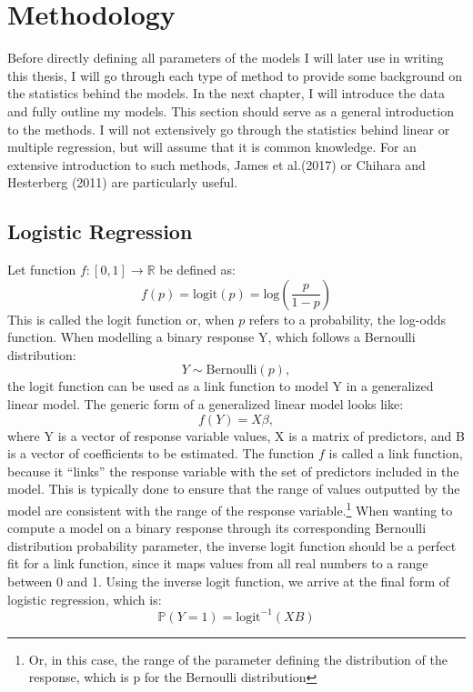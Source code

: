\documentclass[12pt,twoside]{reedthesis}
\begin{document}
  \section{Methodology}\label{methodology}
  
  Before directly defining all parameters of the models I will later use
  in writing this thesis, I will go through each type of method to provide
  some background on the statistics behind the models. In the next
  chapter, I will introduce the data and fully outline my models. This
  section should serve as a general introduction to the methods. I will
  not extensively go through the statistics behind linear or multiple
  regression, but will assume that it is common knowledge. For an
  extensive introduction to such methods, James et al.(2017) or Chihara
  and Hesterberg (2011) are particularly useful.
  
  \subsection{Logistic Regression}\label{logistic-regression}
  
  Let function \(f : [0, 1] \to \mathbb{R}\) be defined as:
  \[f(p) = \text{logit}(p) = \text{log}\left( \frac{p}{1-p} \right)\] This
  is called the logit function or, when \(p\) refers to a probability, the
  log-odds function. When modelling a binary response Y, which follows a
  Bernoulli distribution: \[Y \sim \text{Bernoulli}(p),\] the logit
  function can be used as a link function to model Y in a generalized
  linear model. The generic form of a generalized linear model looks
  like:\\
  \[f(Y) = X\beta ,\] where Y is a vector of response variable values, X
  is a matrix of predictors, and B is a vector of coefficients to be
  estimated. The function \(f\) is called a link function, because it
  ``links'' the response variable with the set of predictors included in
  the model. This is typically done to ensure that the range of values
  outputted by the model are consistent with the range of the response
  variable.\footnote{Or, in this case, the range of the parameter defining
    the distribution of the response, which is p for the Bernoulli
    distribution} When wanting to compute a model on a binary response
  through its corresponding Bernoulli distribution probability parameter,
  the inverse logit function should be a perfect fit for a link function,
  since it maps values from all real numbers to a range between 0 and 1.
  Using the inverse logit function, we arrive at the final form of
  logistic regression, which is:\\
  \[\mathbb{P} (Y = 1) = \text{logit}^{-1} (XB)\]
  
\end{document}
